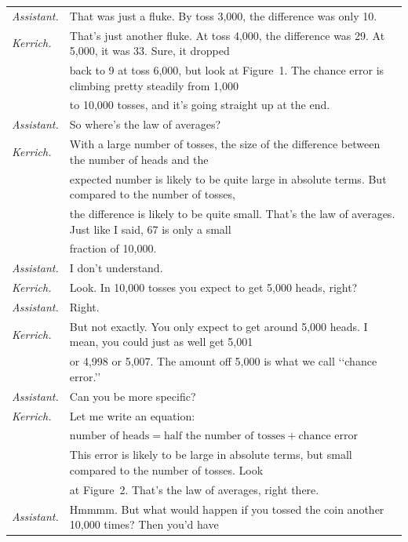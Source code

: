 \documentclass[10pt]{article}
\begin{document}
{\begin{tabular}{ll}
\textit{Assistant.} & That was just a fluke.  By toss 3,000, the difference was 
  only 10.\\[3pt]
\textit{Kerrich.} & That's just another fluke.  At toss 4,000, the difference was 29.
  At 5,000, it was 33.  Sure, it dropped\\
   & back to 9 at toss 6,000, but look at Figure~1.  The chance error is climbing pretty steadily from 1,000\\
   & to 10,000 tosses, and it's going straight up at the end.\\[3pt]
\textit{Assistant.} & So where's the law of averages?\\[3pt]
\textit{Kerrich.} & With a large number of tosses, the size of the difference between
  the number of heads and the \\
   & expected number is likely to be quite large in absolute terms. But compared to the 
   number of tosses, \\
   & the difference is likely to be quite small.  That's the law of averages.  
   Just like I said, 67 is only a small\\ &  fraction of 10,000.\\[3pt]
\textit{Assistant.} & I don't understand.\\[3pt]
\textit{Kerrich.} & Look.  In 10,000 tosses you expect to get 5,000 heads, right?\\[3pt]
\textit{Assistant.} & Right.\\[3pt]
\textit{Kerrich.} & But not exactly.  You only expect to get around 5,000 heads.  I mean,
  you could just as well get 5,001\\ & or 4,998 or
    5,007.  The amount off 5,000 is what we call \lq\lq chance error.\rq\rq\\[3pt]
\textit{Assistant.} & Can you be more specific?\\[3pt]
\textit{Kerrich.} & Let me write an equation:\\[5pt]
  & \hfil
  $\mbox{number of heads} = \mbox{half the number of tosses} + \mbox{chance error}$\\[5pt]
  & This error is likely to be large in absolute terms, but small compared to the 
  number of tosses.
   Look \\ & at Figure~2.  That's the law of averages, right there.\\[3pt]
\textit{Assistant.} & Hmmmm.  But what would happen if you tossed the coin another 10,000 times?  Then you'd have \\

\end{tabular}}
\end{document}
